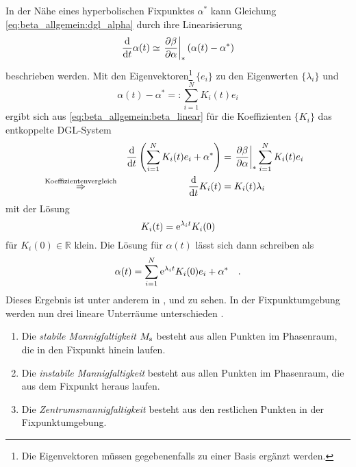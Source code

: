     In der Nähe eines hyperbolischen Fixpunktes $\alpha^*$ kann Gleichung 
    \eqref{eq:beta_allgemein:dgl_alpha} durch ihre Linearisierung
    \begin{equation}
     \frac{\text{d}}{\text{d} t} \alpha(t) \simeq \left.\frac{\partial \beta}{\partial \alpha}\right|_* \left(\alpha(t)-\alpha^*\right) 
     \label{eq:beta_allgemein:beta_linear}
    \end{equation}
     beschrieben werden. Mit den Eigenvektoren\footnote{Die Eigenvektoren 
     müssen gegebenenfalls zu einer Basis ergänzt werden.} $\{e_i\}$ zu den Eigenwerten 
     $\{\lambda_i\}$ und 
     \begin{equation}
      \alpha(t)-\alpha^*=:\sum_{i=1}^N K_i(t) e_i
     \end{equation}
     ergibt sich aus \eqref{eq:beta_allgemein:beta_linear} für die 
     Koeffizienten $\{K_i\}$ das entkoppelte DGL-System
    \begin{align}
     &&\frac{\text{d}}{\text{d} t} \left(\sum\limits_{i=1}^N K_i(t)e_i + \alpha^* \right) &=
     \left.\frac{\partial \beta}{\partial \alpha}\right|_* \sum\limits_{i=1}^N K_i(t) e_i \\
     &\overset{\text{Koeffizientenvergleich}}{\Rightarrow}
     &  \frac{\text{d}}{\text{d} t} K_i(t) &= K_i(t) \lambda_i & \label{eq:beta_allgemein:K} 
    \end{align}
    mit der Lösung
    \begin{equation}
     K_i(t)=\text{e}^{\lambda_i t} K_i(0) \label{eq:beta_allgemein:K_loesung}
    \end{equation}
    für $K_i(0) \in \mathbb{R}$ klein. Die Lösung für $\alpha(t)$ lässt sich dann schreiben als 
    \begin{equation}
     \alpha(t)=\sum\limits_{i=1}^N \text{e}^{\lambda_i t} K_i(0) e_i +\alpha^* 
     \label{eq:beta_allgemein:loesung} \quad .
    \end{equation}
    Dieses Ergebnis ist unter anderem in \cite{Weinberg:1976}, \cite{GR_Weinberg} und 
    \cite{Asymptotic_safety_guaranteed} zu sehen.
    In der Fixpunktumgebung werden nun drei lineare Unterräume unterschieden 
    \cite{Bronstein4}.
    \begin{enumerate}
      \item Die \textit{stabile Mannigfaltigkeit} $M_\text{s}$ besteht aus allen Punkten im Phasenraum, 
      die in den Fixpunkt hinein laufen.
      \item Die \textit{instabile Mannigfaltigkeit} besteht aus allen Punkten im Phasenraum, 
      die aus dem Fixpunkt heraus laufen.
      \item Die \textit{Zentrumsmannigfaltigkeit} besteht aus den restlichen 
      Punkten in der Fix\-punkt\-um\-ge\-bung.
     \end{enumerate}
